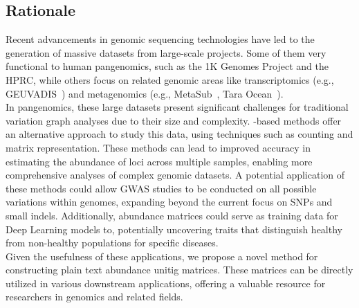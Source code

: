 \subsection{Rationale}
Recent advancements in genomic sequencing technologies have led to the generation of massive datasets from large-scale projects. Some of them very functional to human pangenomics, such as the 1K Genomes Project and the HPRC, while others focus on related genomic areas like transcriptomics (e.g., GEUVADIS~\cite{geuvadis}) and metagenomics (e.g.,  MetaSub~\cite{metasub}, Tara Ocean~\cite{tara}).\\
In pangenomics, these large datasets present significant challenges for traditional variation graph analyses due to their size and complexity. \kmer-based methods offer an alternative approach to study this data, using techniques such as \kmer counting and matrix representation. These methods can lead to improved accuracy in estimating the abundance of loci across multiple samples, enabling more comprehensive analyses of complex genomic datasets. A potential application of these methods could allow \gls{GWAS} studies to be conducted on all possible variations within genomes, expanding beyond the current focus on \gls{SNP}s and small indels. Additionally, \kmer abundance matrices could serve as training data for Deep Learning models to, potentially uncovering traits that distinguish healthy from non-healthy populations for specific diseases.\\
Given the usefulness of these applications, we propose a novel method for constructing plain text abundance unitig matrices. These matrices can be directly utilized in various downstream applications, offering a valuable resource for researchers in genomics and related fields.


